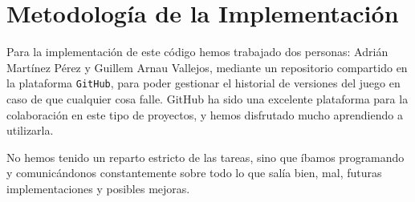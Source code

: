 \documentclass[a4paper,12pt]{article}
\begin{document}
\section*{Metodología de la Implementación}
Para la implementación de este código hemos trabajado dos personas: Adrián Martínez Pérez y Guillem Arnau Vallejos, mediante un repositorio compartido en la plataforma \texttt{GitHub}, para poder gestionar el historial de versiones del juego en caso de que cualquier cosa falle. GitHub ha sido una excelente plataforma para la colaboración en este tipo de proyectos, y hemos disfrutado mucho aprendiendo a utilizarla.

No hemos tenido un reparto estricto de las tareas, sino que íbamos programando y comunicándonos constantemente sobre todo lo que salía bien, mal, futuras implementaciones y posibles mejoras.
\end{document}
